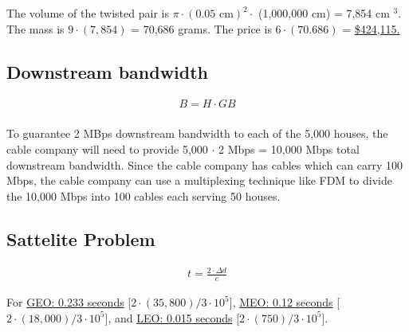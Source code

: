 The volume of the twisted pair is $\pi \cdot (0.05 \text{ cm})^2 \cdot $ (1,000,000 cm) = 7,854 cm $^3$. The mass is $9 \cdot (7,854)$ = 70,686 grams. The price is $6 \cdot (70.686)$ = \ul{\$424,115.}


\subsection{Downstream bandwidth}
\begin{align*}
	B = H \cdot GB \\
\end{align*}

To guarantee 2 MBps downstream bandwidth to each of the 5,000 houses, the cable company will need to provide 5,000 $\cdot$ 2 Mbps = 10,000 Mbps total downstream bandwidth. Since the cable company has cables which can carry 100 Mbps, the cable company can use a multiplexing technique like FDM to divide the 10,000 Mbps into 100 cables each serving 50 houses.

\subsection{Sattelite Problem}
\begin{align*}
	t = \frac{2 \cdot \Delta d}{c}
\end{align*}

For \ul{GEO: 0.233 seconds} [$2 \cdot (35,800) / 3\cdot 10^{5}$], \ul{MEO: 0.12 seconds} [$2 \cdot (18,000) / 3\cdot 10^5$], and \ul{LEO: 0.015 seconds} [$2 \cdot (750) / 3 \cdot 10^5$].




